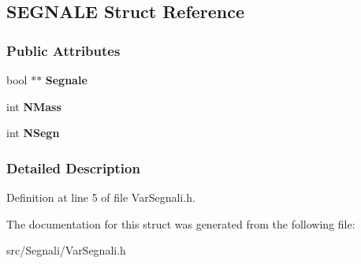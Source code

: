 \hypertarget{structSEGNALE}{\subsection{\-S\-E\-G\-N\-A\-L\-E \-Struct \-Reference}
\label{structSEGNALE}
}
\subsubsection*{\-Public \-Attributes}
\begin{DoxyCompactItemize}
\item 
\hypertarget{structSEGNALE_ac7d273b48195877cf3f9b7f9de912df9}{bool $\ast$$\ast$ {\bfseries \-Segnale}}\label{structSEGNALE_ac7d273b48195877cf3f9b7f9de912df9}

\item 
\hypertarget{structSEGNALE_aeb62e1458ef62b80a349f89b4d04d023}{int {\bfseries \-N\-Mass}}\label{structSEGNALE_aeb62e1458ef62b80a349f89b4d04d023}

\item 
\hypertarget{structSEGNALE_ae17dca7f5e2139ba2ef487859c3f316e}{int {\bfseries \-N\-Segn}}\label{structSEGNALE_ae17dca7f5e2139ba2ef487859c3f316e}

\end{DoxyCompactItemize}


\subsubsection{\-Detailed \-Description}


\-Definition at line 5 of file \-Var\-Segnali.\-h.



\-The documentation for this struct was generated from the following file\-:\begin{DoxyCompactItemize}
\item 
src/\-Segnali/\-Var\-Segnali.\-h\end{DoxyCompactItemize}
